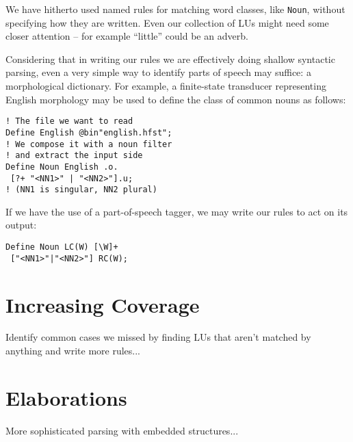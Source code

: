 \documentclass[11pt]{article}
\begin{document}
We have hitherto used named rules for matching word classes, like \verb+Noun+,
without specifying how they are written. Even our collection of LUs might need
some closer attention -- for example ``little'' could be an adverb.

Considering that in writing our
rules we are effectively doing shallow syntactic parsing, even a very simple
way to identify parts of speech may suffice: a morphological dictionary.
For example, a finite-state transducer representing English morphology may be
used to define the class of common nouns as follows:

\begin{verbatim}
! The file we want to read
Define English @bin"english.hfst";
! We compose it with a noun filter
! and extract the input side
Define Noun English .o.
 [?+ "<NN1>" | "<NN2>"].u;
! (NN1 is singular, NN2 plural)
\end{verbatim}

If we have the use of a part-of-speech tagger, we may write our rules to act
on its output:

\begin{verbatim}
Define Noun LC(W) [\W]+
 ["<NN1>"|"<NN2>"] RC(W);
\end{verbatim}

\section{Increasing Coverage}
Identify common cases we missed by finding LUs that aren't matched by
anything and write more rules...

\section{Elaborations}

More sophisticated parsing with embedded structures...





\end{document}

